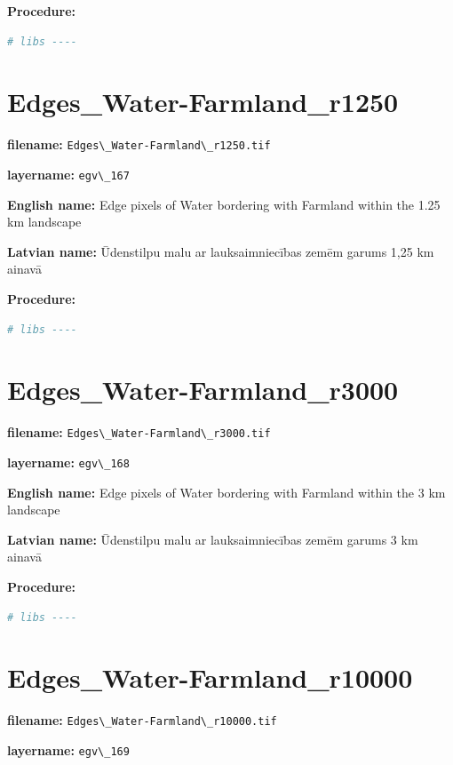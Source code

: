 \documentclass[
]{book}
\newcommand{\passthrough}[1]{#1}
\begin{document}
\textbf{Procedure:}

\begin{lstlisting}[language=R]
# libs ----
\end{lstlisting}

\section{Edges\_Water-Farmland\_r1250}\label{ch06.167}

\textbf{filename:} \passthrough{\lstinline!Edges\_Water-Farmland\_r1250.tif!}

\textbf{layername:} \passthrough{\lstinline!egv\_167!}

\textbf{English name:} Edge pixels of Water bordering with Farmland within the 1.25 km landscape

\textbf{Latvian name:} Ūdenstilpu malu ar lauksaimniecības zemēm garums 1,25 km ainavā

\textbf{Procedure:}

\begin{lstlisting}[language=R]
# libs ----
\end{lstlisting}

\section{Edges\_Water-Farmland\_r3000}\label{ch06.168}

\textbf{filename:} \passthrough{\lstinline!Edges\_Water-Farmland\_r3000.tif!}

\textbf{layername:} \passthrough{\lstinline!egv\_168!}

\textbf{English name:} Edge pixels of Water bordering with Farmland within the 3 km landscape

\textbf{Latvian name:} Ūdenstilpu malu ar lauksaimniecības zemēm garums 3 km ainavā

\textbf{Procedure:}

\begin{lstlisting}[language=R]
# libs ----
\end{lstlisting}

\section{Edges\_Water-Farmland\_r10000}\label{ch06.169}

\textbf{filename:} \passthrough{\lstinline!Edges\_Water-Farmland\_r10000.tif!}

\textbf{layername:} \passthrough{\lstinline!egv\_169!}
\end{document}
